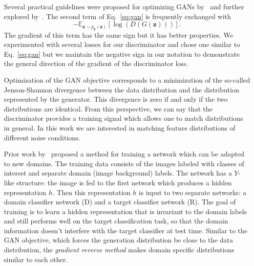 \documentclass[a4paper]{article}
\begin{document}
    Several practical guidelines were proposed for optimizing GANs by~\cite{radford2015unsupervised} and 
    further explored by~\cite{salimans2016improved}. The second term of Eq.~\ref{eq:gan}
    is frequently exchanged with
    \begin{equation}
        - \mathbb{E}_{\bm{z} \sim p_{\bm{z}}(\bm{z})}[\log (D(G(\bm{z})))].
    \end{equation}
    The gradient of this term has the same sign but it has better properties.
    We experimented with several losses for our discriminator and chose one
    similar to Eq.~\ref{eq:gan} but we maintain the negative sign in our notation
    to demonstrate the general direction of the gradient of the discriminator loss.

    Optimization of the GAN objective corresponds to a minimization of the
    so-called Jenson-Shannon divergence between the data distribution and the
    distribution represented by the generator. This divergence is zero if and
    only if the two distributions are identical. From this perspective, we can
    say that the discriminator provides a training signal which allows
    one to match distributions in general. In this work we are interested in
    matching feature distributions of different noise conditions.

    Prior work by~\cite{ganin2014unsupervised} proposed a method for training a network 
    which can be adapted to new domains. The training data consists of the images
    labeled with classes of interest and separate domain (image background) labels. 
    The network has a $Y$-like structure: the image is fed to the
    first network which produces a hidden representation $h$. Then this 
    representation $h$ is input to two separate networks: a domain classifier network (D) and 
    a target classifier network (R). The goal of training is to learn a hidden 
    representation that is invariant to the domain labels and still performs well on 
    the target classification task, so that the domain information doesn't 
    interfere with the target classifier at test time. Similar to the GAN 
    objective, which forces the generation distribution be close to the data distribution,
    the \emph{gradient reverse method} makes domain specific distributions similar to each other.
\end{document}
